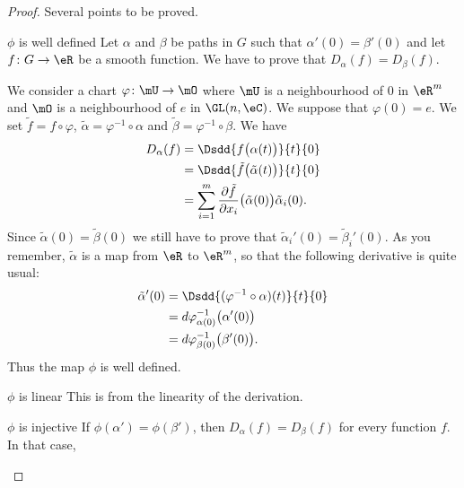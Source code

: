\begin{proof}
    Several points to be proved.
    \begin{subproof}
        \item[\( \phi\) is well defined]
            Let \( \alpha\) and \( \beta\) be paths in \( G\) such that \( \alpha'(0)=\beta'(0)\) and let \( f\colon G\to \eR\) be a smooth function. We have to prove that \( D_{\alpha}(f)=D_{\beta}(f)\).

            We consider a chart \( \varphi\colon \mU\to \mO\) where \( \mU\) is a neighbourhood of \( 0\) in \( \eR^m\) and \( \mO\) is a neighbourhood of \( e\) in \( \GL(n,\eC)\). We suppose that \( \varphi(0)=e\). We set \( \tilde f=f\circ \varphi\), \( \tilde \alpha=\varphi^{-1}\circ \alpha\) and \( \tilde \beta=\varphi^{-1}\circ\beta\). We have
            \begin{subequations}
                \begin{align}
                    D_{\alpha}(f)&=\Dsdd{ f\big( \alpha(t) \big) }{t}{0}\\
                    &=\Dsdd{ \tilde f\big( \tilde \alpha(t) \big) }{t}{0}\\
                    &=\sum_{i=1}^m\frac{ \partial \tilde f }{ \partial x_i }\big( \tilde \alpha(0) \big)\tilde \alpha_i(0).
                \end{align}
            \end{subequations}
            Since \( \tilde \alpha(0)=\tilde \beta(0)\) we still have to prove that \( \tilde \alpha_i'(0)=\tilde \beta_i'(0)\). As you remember, \( \tilde \alpha\) is a map from \( \eR\) to \( \eR^m\), so that the following derivative is quite usual:
            \begin{subequations}
                \begin{align}
                    \tilde \alpha'(0)&=\Dsdd{ (\varphi^{-1}\circ \alpha)(t) }{t}{0}\\
                    &=d\varphi^{-1}_{\alpha(0)}\big( \alpha'(0) \big)\\
                    &=d\varphi^{-1}_{\beta(0)}\big( \beta'(0) \big).
                \end{align}
            \end{subequations}
            Thus the map \( \phi\) is well defined.
        \item[\( \phi\) is linear]
            This is from the linearity of the derivation.
        \item[\( \phi\) is injective]
            If \( \phi(\alpha')=\phi(\beta')\), then \( D_{\alpha}(f)=D_{\beta}(f)\) for every function \( f\). In that case,

\end{subproof}
\end{proof}
